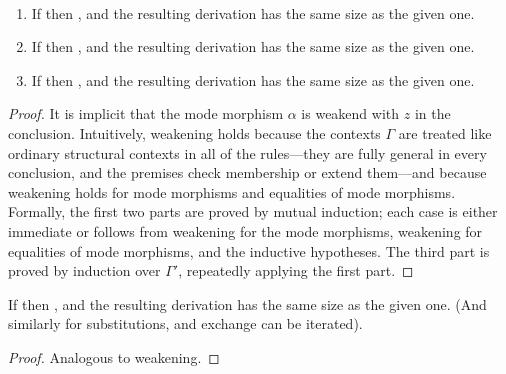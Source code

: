 \begin{lemma} \label{thm:weakening} ~
\begin{enumerate}
\item If  then
, and the resulting
derivation has the same size as the given one.  
\item If  then
, and the resulting
derivation has the same size as the given one.  
\item If  then
, and the resulting
derivation has the same size as the given one.  
\end{enumerate}
\end{lemma}
\begin{proof}
It is implicit that the mode morphism $\alpha$ is weakend with $z$ in
the conclusion.  Intuitively, weakening holds because the contexts
$\Gamma$ are treated like ordinary structural contexts in all of the
rules---they are fully general in every conclusion, and the premises
check membership or extend them---and because weakening holds for mode
morphisms and equalities of mode morphisms.  Formally, the first two
parts are proved by mutual induction; each case is either immediate
or follows from weakening for the mode morphisms, weakening for
equalities of mode morphisms, and the inductive hypotheses.  The third
part is proved by induction over $\Gamma'$, repeatedly applying the
first part.  
\end{proof}

\begin{lemma}
If  then
, and the resulting derivation
has the same size as the given one.  (And similarly for substitutions,
and exchange can be iterated).  
\end{lemma}
\begin{proof} Analogous to weakening.  
\end{proof}


